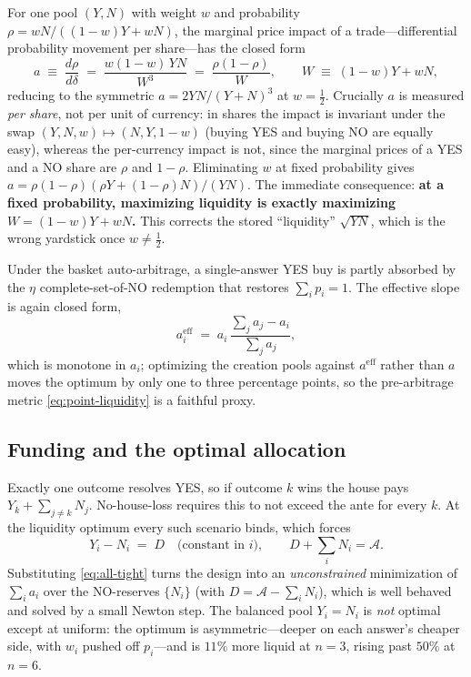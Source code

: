 \documentclass[11pt]{article}
\begin{document}
For one pool $(Y, N)$ with weight $w$ and probability $\rho = w N / ((1-w)Y + wN)$, the marginal price impact of a trade---differential probability movement per share---has the closed form
\begin{equation}
a \;\equiv\; \frac{d\rho}{d\delta} \;=\; \frac{w(1-w)\,Y N}{W^{3}} \;=\; \frac{\rho(1-\rho)}{W}, \qquad W \;\equiv\; (1-w)Y + wN,
\label{eq:point-liquidity}
\end{equation}
reducing to the symmetric $a = 2YN/(Y+N)^3$ at $w = \tfrac12$. Crucially $a$ is measured \emph{per share}, not per unit of currency: in shares the impact is invariant under the swap $(Y,N,w)\mapsto(N,Y,1-w)$ (buying YES and buying NO are equally easy), whereas the per-currency impact is not, since the marginal prices of a YES and a NO share are $\rho$ and $1-\rho$. Eliminating $w$ at fixed probability gives $a = \rho(1-\rho)(\rho Y + (1-\rho)N)/(YN)$. The immediate consequence: \textbf{at a fixed probability, maximizing liquidity is exactly maximizing $W = (1-w)Y + wN$.} This corrects the stored ``liquidity'' $\sqrt{YN}$, which is the wrong yardstick once $w \neq \tfrac12$.

Under the basket auto-arbitrage, a single-answer YES buy is partly absorbed by the $\eta$ complete-set-of-NO redemption that restores $\sum_i p_i = 1$. The effective slope is again closed form,
\begin{equation}
a_i^{\mathrm{eff}} \;=\; a_i\,\frac{\sum_j a_j - a_i}{\sum_j a_j},
\label{eq:eff-liquidity}
\end{equation}
which is monotone in $a_i$; optimizing the creation pools against $a^{\mathrm{eff}}$ rather than $a$ moves the optimum by only one to three percentage points, so the pre-arbitrage metric \eqref{eq:point-liquidity} is a faithful proxy.

\subsection{Funding and the optimal allocation}

Exactly one outcome resolves YES, so if outcome $k$ wins the house pays $Y_k + \sum_{j\neq k} N_j$. No-house-loss requires this to not exceed the ante for every $k$. At the liquidity optimum every such scenario binds, which forces
\begin{equation}
Y_i - N_i \;=\; D \quad\text{(constant in } i\text{)}, \qquad D + \textstyle\sum_i N_i = \mathcal{A}.
\label{eq:all-tight}
\end{equation}
Substituting \eqref{eq:all-tight} turns the design into an \emph{unconstrained} minimization of $\sum_i a_i$ over the NO-reserves $\{N_i\}$ (with $D = \mathcal{A} - \sum_i N_i$), which is well behaved and solved by a small Newton step. The balanced pool $Y_i = N_i$ is \emph{not} optimal except at uniform: the optimum is asymmetric---deeper on each answer's cheaper side, with $w_i$ pushed off $p_i$---and is $11\%$ more liquid at $n=3$, rising past $50\%$ at $n=6$.
\end{document}
